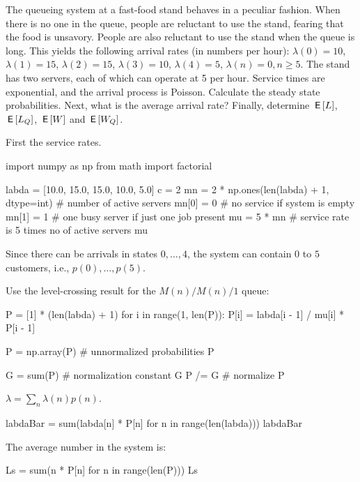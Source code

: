 \documentclass[companion]{subfiles}
\begin{document}
\begin{extra}[Hall 5.8] The queueing system at a fast-food stand behaves in a peculiar fashion.
 When there is no one in the queue, people are reluctant to use the stand, fearing that the food is unsavory.
 People are also reluctant to use the stand when the queue is long.
 This yields the following arrival rates (in numbers per hour): $\lambda(0) = 10$, $\lambda(1)=15$, $\lambda(2)=15$, $\lambda(3)=10$, $\lambda(4)=5$, $\lambda(n)=0, n\geq 5$.
 The stand has two servers, each of which can operate at 5 per hour.
 Service times are exponential, and the arrival process is Poisson.
 Calculate the steady state probabilities.
 Next, what is the average arrival rate?
 Finally, determine $\,\mathsf{E}\left[L\right]$, $\,\mathsf{E}\left[L_Q\right]$, $\,\mathsf{E}\left[W\right]$ and $\,\mathsf{E}\left[W_Q\right]$.
\begin{solution}
First the service rates.
\begin{pyconsole}
import numpy as np
from math import factorial

labda = [10.0, 15.0, 15.0, 10.0, 5.0]
c = 2
mn = 2 * np.ones(len(labda) + 1, dtype=int)  # number of active servers
mn[0] = 0  # no service if system is empty
mn[1] = 1  # one busy server if just one job present
mu = 5 * mn  # service rate is 5 times no of active servers
mu
\end{pyconsole}

Since there can be arrivals in states $0,\ldots, 4$, the system can contain $0$ to $5$ customers, i.e., $p(0),\ldots, p(5)$.

Use the level-crossing result for the $M(n)/M(n)/1$ queue:

\begin{pyconsole}
P = [1] * (len(labda) + 1)
for i in range(1, len(P)):
    P[i] = labda[i - 1] / mu[i] * P[i - 1]

P = np.array(P)  # unnormalized probabilities
P
\end{pyconsole}

\begin{pyconsole}
G = sum(P)  # normalization constant
G
P /= G  # normalize
P
\end{pyconsole} 

$\lambda = \sum_{n}\lambda(n) p(n)$.

\begin{pyconsole}
labdaBar = sum(labda[n] * P[n] for n in range(len(labda)))
labdaBar
\end{pyconsole}


The average number in the system is: 

\begin{pyconsole}
Ls = sum(n * P[n] for n in range(len(P)))
Ls
\end{pyconsole}



\end{solution}
\end{extra}
\end{document}
